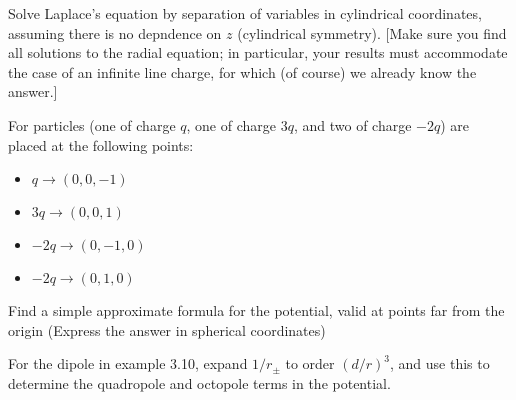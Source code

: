 \documentclass{homework}
\begin{document}
\begin{homeworkProblem}[Problem 3.24]

  Solve Laplace's equation by separation of variables in cylindrical coordinates, assuming there is no depndence on $z$ (cylindrical symmetry). [Make sure you find all solutions to the radial equation; in particular, your results must accommodate the case of an infinite line charge, for which (of course) we already know the answer.]

  \vspace{.2in}

  \problemAnswer{ %

  }
\end{homeworkProblem}

\begin{homeworkProblem}[Problem 3.29]

  For particles (one of charge $q$, one of charge $3q$, and two of charge $-2q$) are placed at the following points:

  \begin{itemize}
    \item $q \rightarrow (0, 0, -1)$
    \item $3q \rightarrow (0, 0, 1)$
    \item $-2q \rightarrow (0, -1, 0)$
    \item $-2q \rightarrow (0, 1, 0)$
  \end{itemize}

  Find a simple approximate formula for the potential, valid at points far from the origin (Express the answer in spherical coordinates)

  \vspace{.2in}

  \problemAnswer{ %

  }
\end{homeworkProblem}

\begin{homeworkProblem}[Problem 3.31]

  For the dipole in example 3.10, expand $1/r_{\pm}$ to order $(d/r)^3$, and use this to determine the quadropole and octopole terms in the potential.

  \vspace{.2in}

  \problemAnswer{ %

  }
\end{homeworkProblem}
\end{document}
